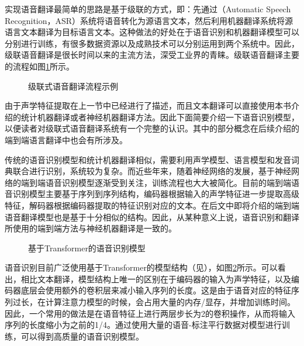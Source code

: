 \parinterval 实现语音翻译最简单的思路是基于级联的方式，即：先通过{\small{}}（Automatic Speech Recognition，ASR）系统将语音转化为源语言文本，然后利用机器翻译系统将源语言文本翻译为目标语言文本。这种做法的好处在于语音识别和机器翻译模型可以分别进行训练，有很多数据资源以及成熟技术可以分别运用到两个系统中。因此，级联语音翻译是很长时间以来的主流方法，深受工业界的青睐。级联语音翻译主要的流程如图\ref{fig:17-4}所示。

\begin{figure}[htp]
\centering

\caption{级联式语音翻译流程示例}
\label{fig:17-4}
\end{figure}

\parinterval 由于声学特征提取在上一节中已经进行了描述，而且文本翻译可以直接使用本书介绍的统计机器翻译或者神经机器翻译方法。因此下面简要介绍一下语音识别模型，以便读者对级联式语音翻译系统有一个完整的认识。其中的部分概念在后续介绍的端到端语言翻译中也会有所涉及。

\parinterval 传统的语音识别模型和统计机器翻译相似，需要利用声学模型、语言模型和发音词典联合进行识别，系统较为复杂。而近些年来，随着神经网络的发展，基于神经网络的端到端语音识别模型逐渐受到关注，训练流程也大大被简化。目前的端到端语音识别模型主要基于序列到序列结构，编码器根据输入的声学特征进一步提取高级特征，解码器根据编码器提取的特征识别对应的文本。在后文中即将介绍的端到端语音翻译模型也是基于十分相似的结构。因此，从某种意义上说，语音识别和翻译所使用的端到端方法与神经机器翻译是一致的。
\begin{figure}[htp]
\centering

\setlength{\abovecaptionskip}{-0.2em}
\caption{基于Transformer的语音识别模型}
\label{fig:17-5}
\end{figure}

\vspace{-1em}
\parinterval 语音识别目前广泛使用基于Transformer的模型结构（见{\chaptertwelve}），如图\ref{fig:17-5}所示。可以看出，相比文本翻译，模型结构上唯一的区别在于编码器的输入为声学特征，以及编码器底层会使用额外的卷积层来减小输入序列的长度。这是由于语音对应的特征序列过长，在计算注意力模型的时候，会占用大量的内存/显存，并增加训练时间。因此，一个常用的做法是在语音特征上进行两层步长为2的卷积操作，从而将输入序列的长度缩小为之前的1/4。通过使用大量的语音-标注平行数据对模型进行训练，可以得到高质量的语音识别模型。


